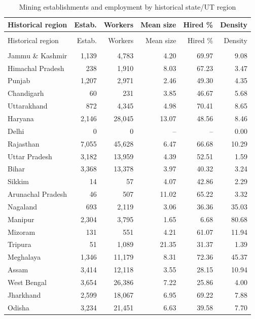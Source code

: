 \documentclass[11pt,a4paper]{report}
\begin{document}
\begin{longtable}{>{\raggedright\arraybackslash}p{5.0cm}rrrrr}
\caption{Mining establishments and employment by historical state/\allowbreak{}UT region}\\\toprule
Historical region & Estab. & Workers & Mean size & Hired \% & Density \\\midrule\endfirsthead
\multicolumn{6}{l}{\textit{Continued from previous page}}\\\toprule
Historical region & Estab. & Workers & Mean size & Hired \% & Density \\\midrule\endhead
\midrule\multicolumn{6}{r}{\textit{Continued on next page}}\\\endfoot\bottomrule\endlastfoot
Jammu \& Kashmir & 1,139 & 4,783 & 4.20 & 69.97 & 9.08 \\
Himachal Pradesh & 238 & 1,910 & 8.03 & 67.23 & 3.47 \\
Punjab & 1,207 & 2,971 & 2.46 & 49.30 & 4.35 \\
Chandigarh & 60 & 231 & 3.85 & 46.67 & 5.68 \\
Uttarakhand & 872 & 4,345 & 4.98 & 70.41 & 8.65 \\
Haryana & 2,146 & 28,045 & 13.07 & 48.56 & 8.46 \\
Delhi & 0 & 0 & -- & -- & 0.00 \\
Rajasthan & 7,055 & 45,628 & 6.47 & 66.68 & 10.29 \\
Uttar Pradesh & 3,182 & 13,959 & 4.39 & 52.51 & 1.59 \\
Bihar & 3,368 & 13,378 & 3.97 & 40.32 & 3.24 \\
Sikkim & 14 & 57 & 4.07 & 42.86 & 2.29 \\
Arunachal Pradesh & 46 & 507 & 11.02 & 65.22 & 3.32 \\
Nagaland & 693 & 2,119 & 3.06 & 36.36 & 35.03 \\
Manipur & 2,304 & 3,795 & 1.65 & 6.68 & 80.68 \\
Mizoram & 131 & 551 & 4.21 & 61.07 & 11.94 \\
Tripura & 51 & 1,089 & 21.35 & 31.37 & 1.39 \\
Meghalaya & 1,346 & 11,179 & 8.31 & 72.36 & 45.37 \\
Assam & 3,414 & 12,118 & 3.55 & 28.15 & 10.94 \\
West Bengal & 3,654 & 26,386 & 7.22 & 25.86 & 4.00 \\
Jharkhand & 2,599 & 18,067 & 6.95 & 69.22 & 7.88 \\
Odisha & 3,234 & 21,451 & 6.63 & 39.58 & 7.70 \\

\end{longtable}
\end{document}
